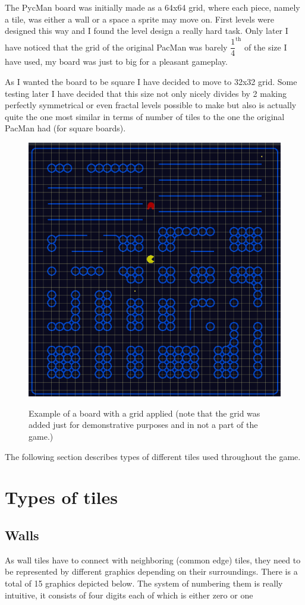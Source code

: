 \documentclass[11pt,a4paper]{report}
\newcommand{\dsubsection}[1]{\FloatBarrier \subsection{#1}}
\newenvironment{img}{
	\begin{center}
		\begin{figure}[H]
			\begin{center}
			
}{
	\end{center}
		\end{figure}
			\end{center}
}
\begin{document}
			The PycMan board was initially made as a 64x64 grid, where each piece, namely a tile, was either a wall or a space a sprite may move on. First levels were designed this way and I found the level design a really hard task. Only later I have noticed that the grid of the original PacMan was barely $\dfrac{1}{4}^{\text{th}}$ of the size I have used, my board was just to big for a pleasant gameplay.
			
			As I wanted the board to be square I have decided to move to 32x32 grid. Some testing later I have decided that this size not only nicely divides by 2 making perfectly symmetrical or even fractal levels possible to make but also is actually quite the one most similar in terms of number of tiles to the one the original PacMan had (for square boards).
			\begin{img}
				\includegraphics[width=350pt]{images/board_grid}\\
				\caption{Example of a board with a grid applied (note that the grid was added just for demonstrative purposes and in not a part of the game.)}
			\end{img}
			The following section describes types of different tiles used throughout the game.
		\section{Types of tiles}
			\dsubsection{Walls}
				As wall tiles have to connect with neighboring (common edge) tiles, they need to be represented by different graphics depending on their surroundings. 
				There is a total of 15 graphics depicted below. The system of numbering them is really intuitive, it consists of four digits each of which is either zero or one
				
\end{document}
